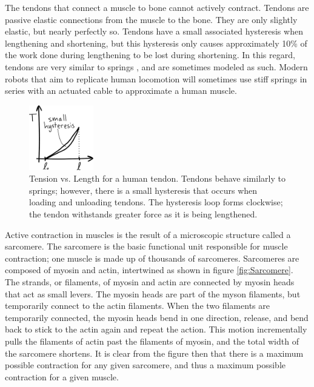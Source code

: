 The tendons that connect a muscle to bone cannot actively contract. Tendons  are passive elastic connections from the muscle to the bone. They are only slightly elastic, but nearly perfectly so. Tendons have a small associated hysteresis  when lengthening and shortening, but this hysteresis only causes approximately 10\% of the work done during lengthening to be lost during shortening. In this regard, tendons are very similar to springs , and are sometimes modeled as such. Modern robots that aim to replicate human locomotion will sometimes use stiff springs in series with an actuated cable to approximate a human muscle. 

\begin{figure}[htb]		%
\begin{centering}
\includegraphics[width=0.25\textwidth]{Figures/TendonTensionPlot}\par
\end{centering}
\caption[Plot: Tension vs. Length for a Human Tendon]{Tension vs. Length for a human tendon. Tendons behave similarly to springs; however, there is a small hysteresis that occurs when loading and unloading tendons. The hysteresis loop forms clockwise; the tendon withstands greater force as it is being lengthened.}
\label{fig:TendonTensionPlot}
\end{figure}
%

Active contraction in muscles is the result of a microscopic structure called a sarcomere. The sarcomere is the basic functional unit responsible for muscle contraction; one muscle is made up of thousands of sarcomeres. Sarcomeres are composed of myosin and actin, intertwined as shown in figure \ref{fig:Sarcomere}. The strands, or filaments, of myosin and actin are connected by myosin heads that act as small levers. The myosin heads are part of the myson filaments, but temporarily connect to the actin filaments. When the two filaments are temporarily connected, the myosin heads bend in one direction, release, and bend back to stick to the actin again and repeat the action. This motion incrementally pulls the filaments of actin past the filaments of myosin, and the total width of the sarcomere shortens. It is clear from the figure then that there is a maximum possible contraction for any given sarcomere, and thus a maximum possible contraction for a given muscle. 

